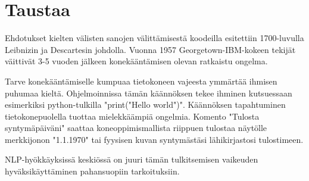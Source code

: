 \chapter{Taustaa\label{methods}}

Ehdotukset kielten välisten sanojen välittämisestä koodeilla esitettiin 1700-luvulla Leibnizin ja Descartesin johdolla. Vuonna 1957 Georgetown-IBM-kokeen tekijät väittivät 3-5 vuoden jälkeen konekääntämisen olevan ratkaistu ongelma.

Tarve konekääntämiselle kumpuaa tietokoneen vajeesta ymmärtää ihmisen puhumaa kieltä. Ohjelmoinnissa tämän käännöksen tekee ihminen kutsuessaan esimerkiksi python-tulkilla "print("Hello world")". Käännöksen tapahtuminen tietokonepuolella tuottaa mielekkäämpiä ongelmia. Komento "Tulosta syntymäpäiväni" saattaa koneoppimismallista riippuen tulostaa näytölle merkkijonon "1.1.1970" tai fyysisen kuvan syntymästäsi lähikirjastosi tulostimeen.

NLP-hyökkäyksissä keskiössä on juuri tämän tulkitsemisen vaikeuden hyväksikäyttäminen pahansuopiin tarkoituksiin.